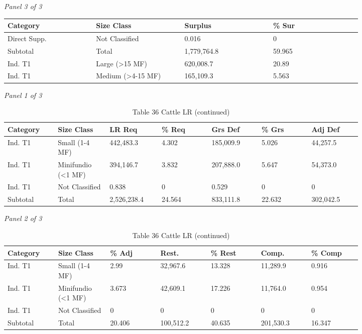 \documentclass[12pt]{article}
\begin{document}
\begin{landscape}
\begin{table}[H]
\vspace{0.6em}

\textit{Panel 3 of 3}\\[2pt]
{\fontsize{12}{14}\selectfont
\setlength{\tabcolsep}{3pt}
\renewcommand{\arraystretch}{1.08}
\begin{tabular}{p{0.205\linewidth}p{0.205\linewidth}p{0.205\linewidth}p{0.205\linewidth}}
\toprule
Category & Size Class & Surplus & \% Sur \\
\midrule
Direct Supp. & Not Classified & 0.016 & 0 \\
Subtotal & Total & 1,779,764.8 & 59.965 \\
Ind. T1 & Large (>15 MF) & 620,008.7 & 20.89 \\
Ind. T1 & Medium (>4-15 MF) & 165,109.3 & 5.563 \\
\bottomrule
\end{tabular}
}
\end{table}
\begin{table}[H]
\centering
\caption{Table 36 Cattle LR (continued)}
\textit{Panel 1 of 3}\\[2pt]
{\fontsize{12}{14}\selectfont
\setlength{\tabcolsep}{3pt}
\renewcommand{\arraystretch}{1.08}
\begin{tabular}{p{0.117\linewidth}p{0.117\linewidth}p{0.117\linewidth}p{0.117\linewidth}p{0.117\linewidth}p{0.117\linewidth}p{0.117\linewidth}}
\toprule
Category & Size Class & LR Req & \% Req & Grs Def & \% Grs & Adj Def \\
\midrule
Ind. T1 & Small (1-4 MF) & 442,483.3 & 4.302 & 185,009.9 & 5.026 & 44,257.5 \\
Ind. T1 & Minifundio (<1 MF) & 394,146.7 & 3.832 & 207,888.0 & 5.647 & 54,373.0 \\
Ind. T1 & Not Classified & 0.838 & 0 & 0.529 & 0 & 0 \\
Subtotal & Total & 2,526,238.4 & 24.564 & 833,111.8 & 22.632 & 302,042.5 \\
\bottomrule
\end{tabular}
}

\vspace{0.6em}

\textit{Panel 2 of 3}\\[2pt]
{\fontsize{12}{14}\selectfont
\setlength{\tabcolsep}{3pt}
\renewcommand{\arraystretch}{1.08}
\begin{tabular}{p{0.117\linewidth}p{0.117\linewidth}p{0.117\linewidth}p{0.117\linewidth}p{0.117\linewidth}p{0.117\linewidth}p{0.117\linewidth}}
\toprule
Category & Size Class & \% Adj & Rest. & \% Rest & Comp. & \% Comp \\
\midrule
Ind. T1 & Small (1-4 MF) & 2.99 & 32,967.6 & 13.328 & 11,289.9 & 0.916 \\
Ind. T1 & Minifundio (<1 MF) & 3.673 & 42,609.1 & 17.226 & 11,764.0 & 0.954 \\
Ind. T1 & Not Classified & 0 & 0 & 0 & 0 & 0 \\
Subtotal & Total & 20.406 & 100,512.2 & 40.635 & 201,530.3 & 16.347 \\
\bottomrule
\end{tabular}
}


\end{table}
\end{landscape}
\end{document}

